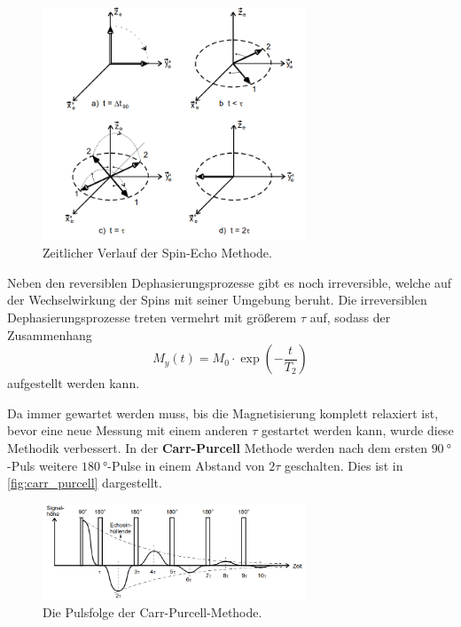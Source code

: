         \begin{figure}[H]
            \centering
            \includegraphics[width=0.7\textwidth]{latex/images/Hahn_echo.png}
            \caption{Zeitlicher Verlauf der Spin-Echo Methode. \cite{finke}}
            \label{fig:hahn}
        \end{figure}

        \noindent Neben den reversiblen Dephasierungsprozesse gibt es noch irreversible, welche auf der Wechselwirkung der Spins mit seiner Umgebung beruht. Die irreversiblen Dephasierungsprozesse 
        treten vermehrt mit größerem $\tau$ auf, sodass der Zusammenhang 
        \begin{equation}
            M_y(t) = M_0 \cdot \exp(-\frac{t}{T_2})
            \label{eqn:expT_2}
        \end{equation}
        aufgestellt werden kann. 
        
        \noindent Da immer gewartet werden muss, bis die Magnetisierung komplett relaxiert ist, bevor eine neue Messung mit einem anderen $\tau$ gestartet werden kann, wurde diese Methodik verbessert. 
        In der \textbf{Carr-Purcell} Methode werden nach dem ersten $\SI{90}{\degree}$-Puls weitere $\SI{180}{\degree}$-Pulse in einem Abstand von $2\tau$ geschalten. Dies ist in \autoref{fig:carr_purcell}
        dargestellt. 

        \begin{figure}[H]
            \centering
            \includegraphics[width=0.7\textwidth]{latex/images/Carr_Purcell.png}
            \caption{Die Pulsfolge der Carr-Purcell-Methode. \cite{finke}}
            \label{fig:carr_purcell}
        \end{figure}

